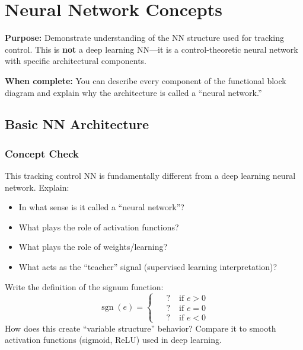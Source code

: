 \section{Neural Network Concepts}

\begin{purposebox}
\textbf{Purpose:} Demonstrate understanding of the NN structure used for tracking control. This is \textbf{not} a deep learning NN---it is a control-theoretic neural network with specific architectural components.

\textbf{When complete:} You can describe every component of the functional block diagram and explain why the architecture is called a ``neural network.''
\end{purposebox}

\subsection{Basic NN Architecture}

\subsubsection*{Concept Check}

This tracking control NN is fundamentally different from a deep learning neural network. Explain:
\begin{itemize}[nosep]
  \item In what sense is it called a ``neural network''?
  \item What plays the role of activation functions?
  \item What plays the role of weights/learning?
  \item What acts as the ``teacher'' signal (supervised learning interpretation)?
\end{itemize}

\begin{answerbox}\end{answerbox}

Write the definition of the signum function:
\[
  \operatorname{sgn}(e) =
  \begin{cases}
    \phantom{-}?\; & \text{if } e > 0 \\
    \phantom{-}?\; & \text{if } e = 0 \\
    \phantom{-}?\; & \text{if } e < 0
  \end{cases}
\]
How does this create ``variable structure'' behavior? Compare it to smooth activation functions (sigmoid, ReLU) used in deep learning.

